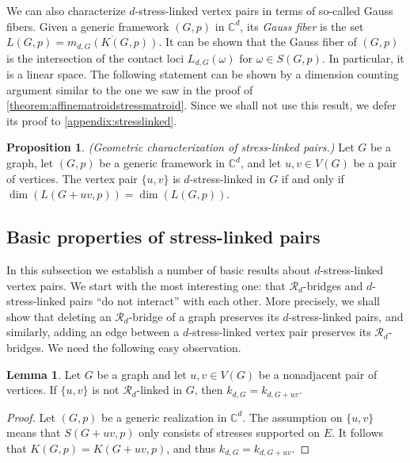 \documentclass[11pt,a4paper,dvipsnames]{scrartcl}
\theoremstyle{definition}
\newtheorem{lemma}[theorem]{Lemma}
\newtheorem{proposition}[theorem]{Proposition}
\newcommand{\CC}{\mathbb{C}}
\newcommand{\stressnullity}[1]{k_{d, #1}}
\newcommand{\strongly}[1]{${#1}$-stress-linked}
\newcommand{\sharedstresskernel}[1]{K}
\newcommand{\contactlocus}[2]{L_{#1,#2}}
\begin{document}
We can also characterize \strongly{d} vertex pairs in terms of so-called Gauss fibers. Given a generic framework $(G,p)$ in $\CC^d$, its \emph{Gauss fiber} is the set $L(G,p) = \overline{m_{d,G}(\sharedstresskernel{d}(G,p))}$. It can be shown that the Gauss fiber of $(G,p)$ is the intersection of the contact loci $\contactlocus{d}{G}(\omega)$ for $\omega \in S(G,p)$. In particular, it is a linear space. The following statement can be shown by a dimension counting argument similar to the one we saw in the proof of \cref{theorem:affinematroidstressmatroid}. Since we shall not use this result, we defer its proof to \cref{appendix:stresslinked}.

\begin{proposition}\label{lemma:gaussfiberchar} \emph{(Geometric characterization of stress-linked pairs.)}\newline
    Let $G$ be a graph, let $(G,p)$ be a generic framework in $\CC^d$, and let $u,v \in V(G)$ be a pair of vertices. The vertex pair $\{u,v\}$ is \strongly{d} in $G$ if and only if $\dim(L(G+uv,p)) = \dim(L(G,p))$.
\end{proposition}

\subsection{Basic properties of stress-linked pairs}

In this subsection we establish a number of basic results about \strongly{d} vertex pairs. We start with the most interesting one: that $\mathcal{R}_d$-bridges and \strongly{d} pairs ``do not interact'' with each other. More precisely, we shall show that deleting an $\mathcal{R}_d$-bridge of a graph preserves its \strongly{d} pairs, and similarly, adding an edge between a \strongly{d} vertex pair preserves its $\mathcal{R}_d$-bridges. We need the following easy observation.

\begin{lemma}\label{lemma:bridgeconverse}
    Let $G$ be a graph and let $u,v \in V(G)$ be a nonadjacent pair of vertices. If $\{u,v\}$ is not $\mathcal{R}_d$-linked in $G$, then $\stressnullity{G} = \stressnullity{G+uv}$.
\end{lemma}
\begin{proof}
    Let $(G,p)$ be a generic realization in $\CC^d$. The assumption on $\{u,v\}$ means that $S(G+uv,p)$ only consists of stresses supported on $E$. It follows that $\sharedstresskernel{d}(G,p) = \sharedstresskernel{d}(G+uv,p)$, and thus $\stressnullity{G} = \stressnullity{G+uv}$.
\end{proof}
\end{document}
